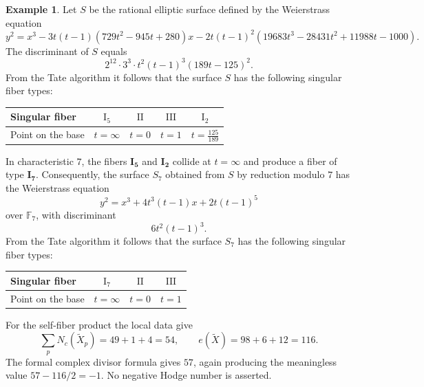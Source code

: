 \documentclass[a4paper]{amsart}
\theoremstyle{plain}
\theoremstyle{definition}
\newtheorem{Exm}[Thm]{Example}
\theoremstyle{remark}
\numberwithin{equation}{section}
\newcommand{\FF}{\mathbb{F}}
\begin{document}
%
\begin{Exm}\label{ex:63}
Let $S$ be the rational elliptic surface defined by the Weierstrass equation
\[
y^2=x^3-3t(t-1)(729t^2-945t+280)x
-2t(t-1)^2(19683t^3-28431t^2+11988t-1000).
\]
The discriminant of $S$ equals
\[
2^{12}\cdot 3^3\cdot t^2(t-1)^3(189t-125)^2.
\]
From the Tate algorithm it follows that the surface $S$ has the following
singular fiber types:
\begin{table}[H]
	\centering
	\renewcommand{\arraystretch}{1.2}
	\begin{tabular}{lcccc}
		\toprule
		Singular fiber
		& $\mathrm{I}_{5}$
		& $\mathrm{II}$
		& $\mathrm{III}$
		& $\mathrm{I}_{2}$ \\
		\midrule
		Point on the base
		& $t=\infty$
		& $t=0$
		& $t=1$
		& $t=\frac{125}{189}$ \\
		\bottomrule
	\end{tabular}
\end{table}

In characteristic $7$, the fibers $\mathbf{I_{5}}$ and $\mathbf{I_{2}}$
collide at $t=\infty$ and produce a fiber of type $\mathbf{I_{7}}$.
Consequently, the surface $S_7$ obtained from $S$ by reduction modulo $7$
has the Weierstrass equation
\[
y^2=x^3+4t^3(t-1)x+2t(t-1)^5
\]
over $\FF_7$, with discriminant
\[
6t^2(t-1)^3.
\]
From the Tate algorithm it follows that the surface $S_7$ has the following
singular fiber types:
\begin{table}[H]
	\centering
	\renewcommand{\arraystretch}{1.2}
	\begin{tabular}{lccc}
		\toprule
		Singular fiber
		& $\mathrm{I}_{7}$
		& $\mathrm{II}$
		& $\mathrm{III}$ \\
		\midrule
		Point on the base & $t=\infty$ & $t=0$ & $t=1$ \\
		\bottomrule
	\end{tabular}
\end{table}

For the self-fiber product the local data give
\[
\sum_pN_c(\widetilde X_p)=49+1+4=54,
\qquad e(\widetilde X)=98+6+12=116.
\]
The formal complex divisor formula gives $57$, again producing the
meaningless value $57-116/2=-1$.  No negative Hodge number is asserted.
\end{Exm}
\end{document}
